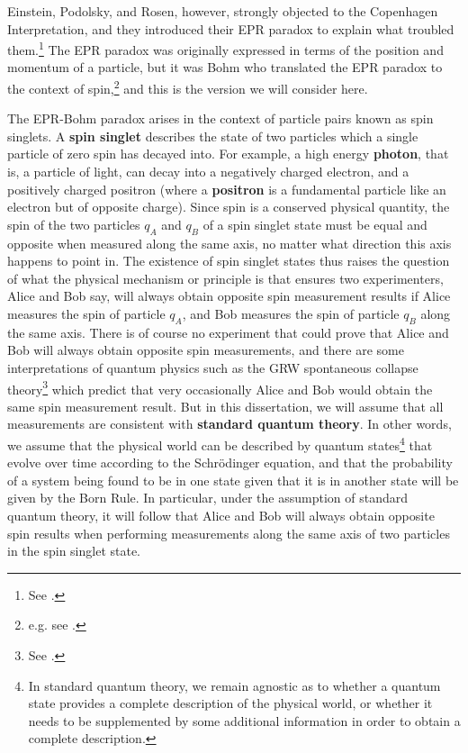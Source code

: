 Einstein, Podolsky, and Rosen, however, strongly objected to the Copenhagen Interpretation, and they introduced their EPR paradox to explain what troubled them.\footnote{See \cite{EinsteinPodolskyRosen}.} The EPR paradox was originally expressed in terms of the position and momentum of a particle, but it was Bohm who translated the EPR paradox to the { context of spin,\footnote{e.g. see \cite[p. 29, Ch. 5 sec. 3, and Ch. 22 sec. 19]{BohmQuantumTheory}. } and this} is the version we will consider here.   

The EPR-Bohm paradox arises in the context of particle pairs known as spin singlets. A \textbf{spin singlet} describes the state of two particles which a single particle of zero spin has decayed into. For example, a high energy \textbf{photon}, that is, a particle of light, can decay into a negatively charged electron, and a positively charged positron (where a \textbf{positron} is a fundamental particle like an electron but of opposite charge). Since spin is a conserved physical quantity, the spin of the two particles $q_A$ and $q_B$ %
%
of a spin singlet state must be equal and opposite when measured along the same axis, no matter what direction this axis happens to point in. The existence of spin singlet states thus raises the question of what the physical mechanism or principle is that ensures two experimenters, Alice and Bob say, will always obtain opposite spin measurement results if Alice measures the spin of particle $q_A$, and Bob measures the spin of particle $q_B$ along the same axis. There is of course no experiment that could prove that Alice and Bob will always obtain opposite spin measurements, and there are some interpretations of quantum physics such as the GRW spontaneous collapse theory\footnote{See \cite{sep-qm-collapse}.} which predict that very occasionally Alice and Bob would obtain the same spin measurement result. But in this dissertation, we will assume that all measurements are consistent with \textbf{standard quantum theory}. In other words, we assume that the physical world can be described by { quantum states\footnote{In standard quantum theory, we remain agnostic as to whether a quantum state provides a complete description of the physical world, or whether it needs to be supplemented by some additional information in order to obtain a complete description.} that evolve} over time according to the Schr\"{o}dinger equation, and that the probability of a system being found to be in one state given that it is in another state will be given by the Born Rule.  In particular, under the assumption of standard quantum theory, it will follow that Alice and Bob will always obtain opposite spin results when performing measurements along the same axis of two particles in the spin singlet state. 


